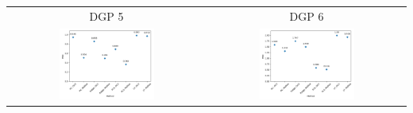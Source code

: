 \begin{table}[h! ]
\begin{tabular}{c c}
        DGP 5 & DGP 6 \\
        \includegraphics[width=0.5\textwidth]{figures/N100_T50_DGP5_Sims1000} &
        \includegraphics[width=0.5\textwidth]{figures/N100_T50_DGP6_Sims1000}
    \end{tabular}
\end{table}

